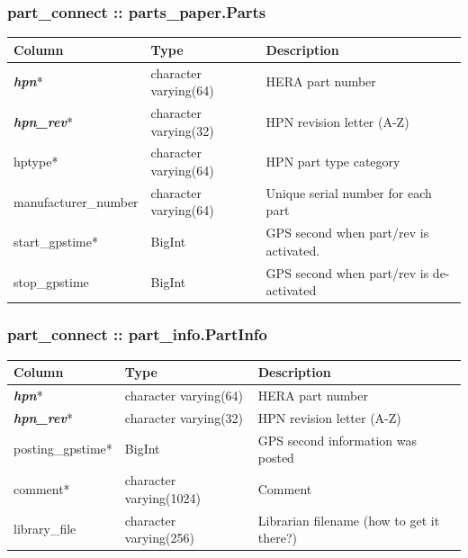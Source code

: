 \documentclass{article}
\begin{document}
\subsubsection{part\_connect :: parts\_paper.Parts}
\begin{center}
\begin{tabular}{| p{4cm} | p{2cm} | p{10cm} |}
\hline
{\bf Column} & {\bf Type} & {\bf Description} \\ \hline
{\bf \em hpn}* & character varying(64) & HERA part number \\ \hline
{\bf \em hpn\_rev}* & character varying(32) & HPN revision letter (A-Z) \\ \hline
hptype*  &  character varying(64) & HPN part type category \\ \hline
manufacturer\_number & character varying(64) & Unique serial number for each part \\ \hline
start\_gpstime* & BigInt & GPS second when part/rev is activated. \\ \hline
stop\_gpstime & BigInt & GPS second when part/rev is de-activated \\ \hline
\end{tabular}
\end{center}

\subsubsection{part\_connect :: part\_info.PartInfo}
\begin{center}
\begin{tabular}{| p{4cm} | p{2cm} | p{10cm} |}
\hline
{\bf Column} & {\bf Type} & {\bf Description} \\ \hline
{\bf \em hpn}* & character varying(64) & HERA part number \\ \hline
{\bf \em hpn\_rev}* & character varying(32) & HPN revision letter (A-Z) \\ \hline
posting\_gpstime* & BigInt & GPS second information was posted \\ \hline
comment* &  character varying(1024) & Comment \\ \hline
library\_file & character varying(256) &  Librarian filename (how to get it there?) \\ \hline
\end{tabular}
\end{center}
\end{document}
